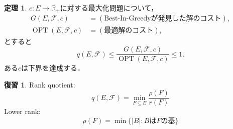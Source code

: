 \documentclass[xelatex,ja=standard,a4paper,14pt,everyparhook=compat]{bxjsarticle}
\newcommand{\bbR}{\mathbb{R}}
\newcommand{\mcF}{\mathcal{F}}
\DeclareMathOperator{\OPT}{OPT}
\theoremstyle{definition}
\newtheorem{theorem}{定理}[section]
\newtheorem*{recall}{復習}
\begin{document}
\newpage

\setcounter{theorem}{18}
\begin{theorem}
    $c:E \to \bbR_+$に対する最大化問題について， \begin{align*}
        G(E,\mcF,c) &= (\text{Best-In-Greedyが発見した解のコスト}), \\
        \OPT(E,\mcF,c) &= (\text{最適解のコスト}),
    \end{align*}
    とすると \begin{equation*}
        q(E,\mcF) \leq \frac{G(E,\mcF,c)}{\OPT(E,\mcF,c)} \leq 1.
    \end{equation*}
    ある$c$は下界を達成する．
\end{theorem}
\begin{recall}
    Rank quotient: \begin{equation*}
        q(E,\mcF) = \min_{F \subseteq E} \frac{\rho(F)}{r(F)}
    \end{equation*}
    Lower rank: \begin{equation*}
        \rho(F) = \min\{|B|: \text{$B$は$F$の基}\}
    \end{equation*}
\end{recall}
\end{document}
